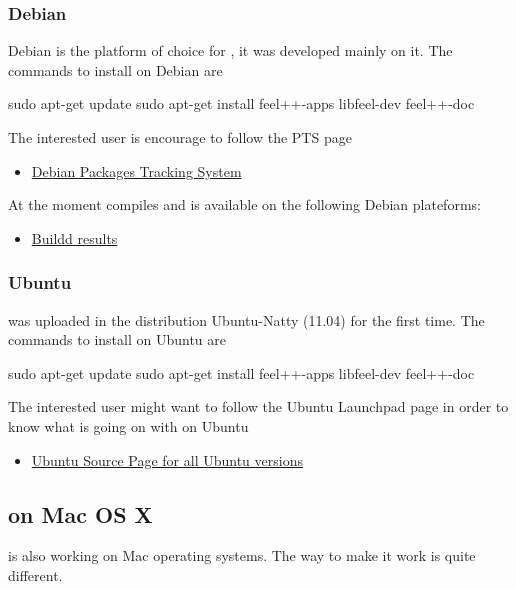\subsubsection{Debian}

Debian is the platform of choice for \feel, it was developed mainly on it. The commands to install \feel on Debian are
\begin{unixcom}
  sudo apt-get update
  sudo apt-get install feel++-apps libfeel-dev feel++-doc
\end{unixcom}


The interested user is encourage to follow the \feel PTS page
\begin{itemize}
\item \feel \href{http://packages.qa.debian.org/f/feel%2B%2B.html}{Debian Packages Tracking System}
\end{itemize}

At the moment \feel compiles and is available on the following Debian
plateforms:
\begin{itemize}
\item \feel \href{https://buildd.debian.org/status/package.php?p=feel%2b%2b}{Buildd results}
\end{itemize}

\subsubsection{Ubuntu}

\feel was uploaded in the distribution Ubuntu-Natty (11.04) for the first
time. The commands to install \feel on Ubuntu are
\begin{unixcom}
  sudo apt-get update
  sudo apt-get install feel++-apps libfeel-dev feel++-doc
\end{unixcom}
The interested user might want to follow the Ubuntu Launchpad \feel page in
order to know what is going on with \feel on Ubuntu
\begin{itemize}
\item \feel \href{https://launchpad.net/ubuntu/+source/feel++}{Ubuntu Source
  Page for all Ubuntu versions}
\end{itemize}


\subsection{\Feel on Mac OS X}
\label{macosx}
\feel is also working on Mac operating systems. The way to make it work is quite different.

